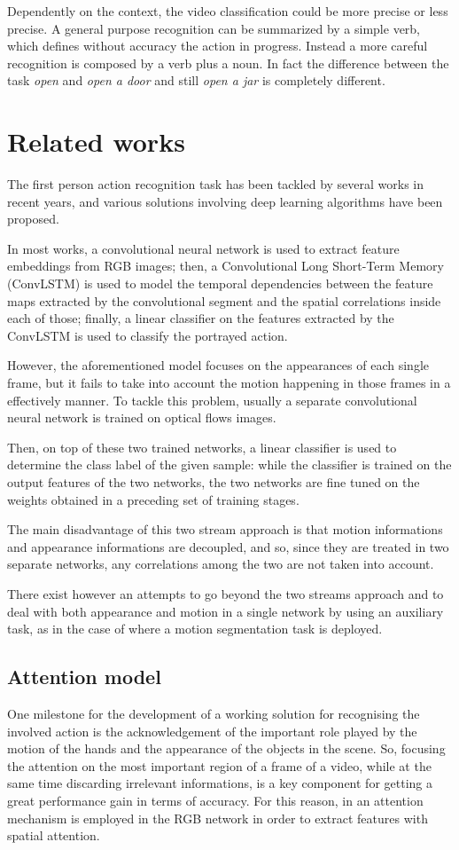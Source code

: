 \documentclass[10pt,twocolumn,letterpaper]{article}
\begin{document}
Dependently on the context, the video classification could be more precise or less precise. A general purpose recognition can be summarized by a simple verb, which defines without accuracy the action in progress. Instead a more careful recognition is composed by a verb plus a noun. In fact the difference between the task \emph{open} and \emph{open a door} and still \emph{open a jar} is completely different.

\section{Related works}

The first person action recognition task has been tackled by several works in recent years, and various solutions involving deep learning algorithms have been proposed.

In most works, a convolutional neural network is used to extract feature embeddings from RGB images; then, a Convolutional Long Short-Term Memory (ConvLSTM) is used to model the temporal dependencies between the feature maps extracted by the convolutional segment and the spatial correlations inside each of those; finally, a linear classifier on the features extracted by the ConvLSTM is used to classify the portrayed action.

However, the aforementioned model focuses on the appearances of each single frame, but it fails to take into account the motion happening in those frames in a effectively manner. To tackle this problem, usually a separate convolutional neural network is trained on optical flows images.

Then, on top of these two trained networks, a linear classifier is used to determine the class label of the given sample: while the classifier is trained on the output features of the two networks, the two networks are fine tuned on the weights obtained in a preceding set of training stages.

The main disadvantage of this two stream approach is that motion informations and appearance informations are decoupled, and so, since they are treated in two separate networks, any correlations among the two are not taken into account.

There exist however an attempts to go beyond the two streams approach and to deal with both appearance and motion in a single network by using an auxiliary task, as in the case of \cite{planamente2020joint} where a motion segmentation task is deployed.

\subsection{Attention model}
One milestone for the development of a working solution for recognising the involved action is the acknowledgement of the important role played by the motion of the hands and the appearance of the objects in the scene. So, focusing the attention on the most important region of a frame of a video, while at the same time discarding irrelevant informations, is a key component for getting a great performance gain in terms of accuracy. For this reason, in \cite{Ego-RNN} an attention mechanism is employed in the RGB network in order to extract features with spatial attention.
\end{document}
